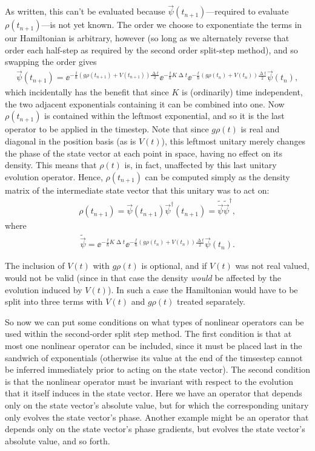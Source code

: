 As written, this can't be evaluated because $\vec \psi(t_{n+1})$---required to evaluate $\rho(t_{n+1})$---is not yet known. The order we choose to exponentiate the terms in our Hamiltonian is arbitrary, however (so long as we alternately reverse that order each half-step as required by the second order split-step method),
and so swapping the order gives
\begin{align}
\vec \psi(t_{n+1}) =
\ee^{-\frac\ii\hbar (g\rho(t_{n+1}) + V(t_{n+1})) \frac{\upDelta t} 2}
\ee^{-\frac\ii\hbar K \upDelta t}
\ee^{-\frac\ii\hbar (g\rho(t_n) + V(t_n) ) \frac{\upDelta t} 2}
\vec \psi(t_n),
\end{align}
which incidentally has the benefit that since $K$ is (ordinarily) time independent, the two adjacent exponentials containing it can be combined into one. Now $\rho(t_{n+1})$ is contained within the leftmost exponential, and so it is the last operator to be applied in the timestep. Note that since $g\rho(t)$ is real and diagonal in the position basis (as is $V(t)$), this leftmost unitary merely changes the phase of the state vector at each point in space, having no effect on its density. This means that $\rho(t)$ is, in fact, unaffected by this last unitary evolution operator. Hence, $\rho(t_{n+1})$ can be computed simply as the density matrix of the intermediate state vector that this unitary was to act on:
\begin{align}
\rho(t_{n+1}) = \vec\psi(t_{n+1})\vec\psi^\dagger(t_{n+1}) = \tilde{\vec\psi}\tilde{\vec\psi}^\dagger,
\end{align}
where
\begin{align}
\tilde{\vec\psi} = 
\ee^{-\frac\ii\hbar K \upDelta t}
\ee^{-\frac\ii\hbar (g\rho(t_n) + V(t_n) ) \frac{\upDelta t} 2}
\vec \psi(t_n).
\end{align}

The inclusion of $V(t)$ with $g\rho(t)$ is optional, and if $V(t)$ was not real valued, would not be valid (since in that case the density \emph{would} be affected by the evolution induced by $V(t)$). In such a case the Hamiltonian would have to be split into three terms with $V(t)$ and $g\rho(t)$ treated separately.

So now we can put some conditions on what types of nonlinear operators can be used within the second-order split step method. The first condition is that at most one nonlinear operator can be included, since it must be placed last in the sandwich of exponentials (otherwise its value at the end of the timsestep cannot be inferred immediately prior to acting on the state vector). The second condition is that the nonlinear operator must be invariant with respect to the evolution that it itself induces in the state vector. Here we have an operator that  depends only on the state vector's absolute value, but for which the corresponding unitary only evolves the state vector's phase. Another example might be an operator that depends only on the state vector's phase gradients, but evolves the state vector's absolute value, and so forth.

